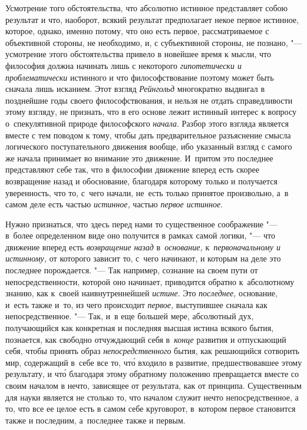 Усмотрение того обстоятельства, что абсолютно истинное представляет собою
результат и что, наоборот, всякий результат предполагает некое первое истинное,
которое, однако, именно потому, что оно есть первое, рассматриваемое с
объективной стороны, не необходимо, и, с субъективной стороны, не познано, "---
усмотрение этого обстоятельства привело в новейшее время к мысли, что философия
должна начинать лишь с некоторого {\em гипотетически и проблематически}
истинного и что философствование поэтому может быть сначала лишь исканием. Этот
взгляд {\em Рейнгольд} многократно выдвигал в позднейшие годы своего
философствования, и нельзя не отдать справедливости этому взгляду, не признать,
что в его основе лежит истинный интерес к вопросу о~спекулятивной природе
философского {\em начала}. Разбор этого взгляда является вместе с тем поводом к
тому, чтобы дать предварительное разъяснение смысла логического поступательного
движения вообще, ибо указанный взгляд с самого же начала принимает во внимание
это движение. И~притом это последнее представляют себе так, что в философии
движение вперед есть скорее возвращение назад и обоснование, благодаря которому
только и получается уверенность, что то, с~чего начали, не~есть только принятое
произвольно, а~в самом деле есть частью {\em истинное,} частью
{\em первое истинное}.

Нужно признаться, что здесь перед нами то существенное соображение "--- в~более
определенном виде оно получится в рамках самой логики, "--- что движение вперед
есть {\em возвращение назад} в~{\em основание,} к~{\em первоначальному и
истинному,} от которого зависит то, с~чего начинают, и которым на деле это
последнее порождается. "--- Так например, сознание на своем пути от
непосредственности, которой оно начинает, приводится обратно к~абсолютному
знанию, как к~своей наивнутреннейшей {\em истине}. Это {\em последнее,}
основание, и~есть также и~то, из чего происходит {\em первое,} выступившее
сначала как непосредственное. "--- Так, и~в еще большей мере, абсолютный дух,
получающийся как конкретная и последняя высшая истина всякого бытия, познается,
как свободно отчуждающий себя в~{\em конце} развития и отпускающий себя, чтобы
принять образ {\em непосредственного} бытия, как решающийся сотворить мир,
содержащий в~себе все то, чт\'{о} входило в развитие, предшествовавшее этому
результату, и чт\'{о} благодаря этому обратному положению превращается вместе
со своим началом в нечто, зависящее от результата, как от принципа.
Существенным для науки является не столько то, что началом служит нечто
непосредственное, а то, что все ее целое есть в самом себе круговорот,
в~котором первое становится также и последним, а~последнее также и первым.

